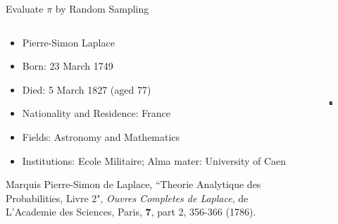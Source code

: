 \documentclass[xcolor=x11names,compress, handout]{beamer}
\renewcommand{\(}{\begin{columns}}
\renewcommand{\)}{\end{columns}}
\newcommand{\<}[1]{\begin{column}{#1}}
\renewcommand{\>}{\end{column}}
\begin{document}
\begin{frame}{Evaluate $\pi$ by Random Sampling}

\begin{columns}
  \begin{column}{0.6\textwidth}
    \begin{itemize}
    \item Pierre-Simon Laplace 
    \item Born: 23 March 1749
    \item Died: 5 March 1827 (aged 77)
    \item Nationality and Residence: France
    \item Fields: Astronomy and Mathematics
    \item Institutions: Ecole Militaire; Alma mater: University of Caen
    \end{itemize}
    \vspace*{0.5 em}
    Marquis Pierre-Simon de Laplace, ``Theorie Analytique des Probabilities, Livre 2",  \textit{Ouvres Completes de Laplace}, de L'Academie des Sciences, Paris, \textbf{7}, part 2, 356-366 (1786).
  \end{column}
  \begin{column}{0.4\textwidth}
  	\begin{figure}
  	\begin{center}
  		\includegraphics[height=2in,clip]{laplace}
	\end{center}
  	\end{figure}
  \end{column}
\end{columns}
\end{frame}
\end{document}

